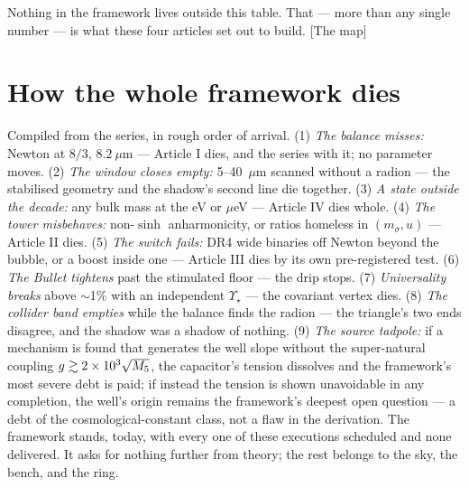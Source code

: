 Nothing in the framework lives outside this table. That --- more than any single number --- is what these four articles set out to build. [The map]

\section{How the whole framework dies}
Compiled from the series, in rough order of arrival. (1) \emph{The balance misses:} Newton at $8/3$, $8.2~\mu$m --- Article I dies, and the series with it; no parameter moves. (2) \emph{The window closes empty:} 5--40~$\mu$m scanned without a radion --- the stabilised geometry and the shadow's second line die together. (3) \emph{A state outside the decade:} any bulk mass at the eV or $\mu$eV --- Article IV dies whole. (4) \emph{The tower misbehaves:} non-$\sinh$ anharmonicity, or ratios homeless in $(m_{\sigma},u)$ --- Article II dies. (5) \emph{The switch fails:} DR4 wide binaries off Newton beyond the bubble, or a boost inside one --- Article III dies by its own pre-registered test. (6) \emph{The Bullet tightens} past the stimulated floor --- the drip stops. (7) \emph{Universality breaks} above $\sim$1\% with an independent $\Upsilon_{\star}$ --- the covariant vertex dies. (8) \emph{The collider band empties} while the balance finds the radion --- the triangle's two ends disagree, and the shadow was a shadow of nothing. (9) \emph{The source tadpole:} if a mechanism is found that generates the well slope without the super-natural coupling $g\gtrsim2\times10^{3}\sqrt{M_5}$, the capacitor's tension dissolves and the framework's most severe debt is paid; if instead the tension is shown unavoidable in any completion, the well's origin remains the framework's deepest open question --- a debt of the cosmological-constant class, not a flaw in the derivation. The framework stands, today, with every one of these executions scheduled and none delivered. It asks for nothing further from theory; the rest belongs to the sky, the bench, and the ring.

\appendix
